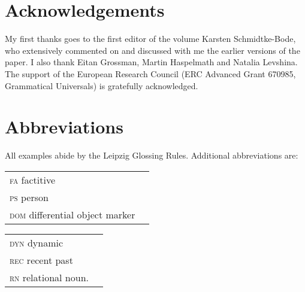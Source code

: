 \documentclass[output=paper]{langsci/langscibook}
\begin{document}
\section*{Acknowledgements} 

My first thanks goes to the first editor of the volume Karsten Schmidtke-Bode, who extensively commented on and discussed with me the earlier versions of the paper. I also thank Eitan Grossman, Martin Haspelmath and Natalia Levshina. The support of the European Research Council (ERC Advanced Grant 670985, Grammatical Universals) is gratefully acknowledged.

\section*{Abbreviations} 

All examples abide by the Leipzig Glossing Rules. Additional abbreviations are: 

\begin{tabularx}{.45\textwidth}{lQ}
\textsc{fa}  factitive \\
\textsc{ps}  person \\
\textsc{dom}  differential object marker 
\end{tabularx}
\begin{tabularx}{.45\textwidth}{lQ}
\textsc{dyn}   dynamic \\
\textsc{rec}  recent past \\
\textsc{rn}   relational noun.
\end{tabularx}

\sloppy
\printbibliography[heading=subbibliography,notkeyword=this] 
\end{document}

